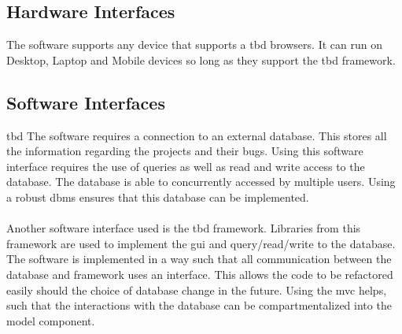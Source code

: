 \documentclass{article}
\newcommand{\comment}[1]{}
\begin{document}
\subsection{Hardware Interfaces}
\comment{i
Describe the logical and physical characteristics of each interface between the software product and the hardware components of the system. This may include the supported device types, the communication protocols to be used.
	}
The software supports any device that supports a \acrshort{tbd} browsers. It can run on Desktop, Laptop and Mobile devices so long as they support the \acrshort{tbd} framework.
\subsection{Software Interfaces}
\comment{
Describe the connections between this product and other specific software components (name and version) including databases, operating systems, tools, libraries, and integrated commercial components. Identify the data items or messages coming into the system and going out and describe the purpose of each. Describe the services needed and the nature of communications. Refer to documents that describe detailed application programmin interface protocols. Identify data that will be shared across software components. If the data sharing mechanisim must be implemented in a specific way (for example, use of a global data area in a multitasking operating system), specify this as an implementation constraint.
}
\acrshort{tbd}
The software requires a connection to an external \gls{database}. This stores all the information regarding the projects and their bugs. Using this software interface requires the use of queries as well as read and write access to the \gls{database}. The \gls{database} is able to concurrently accessed by multiple users. Using a robust \acrshort{dbms} ensures that this \gls{database} can be implemented.
\\ \\
Another software interface used is the \acrshort{tbd} framework. Libraries from this framework are used to implement the \acrshort{gui} and query/read/write to the \gls{database}. The software is implemented in a way such that all communication between the \gls{database} and framework uses an interface. This allows the code to be refactored easily should the choice of \gls{database} change in the future. Using the \acrshort{mvc} helps, such that the interactions with the \gls{database} can be compartmentalized into the model component.
\end{document}
